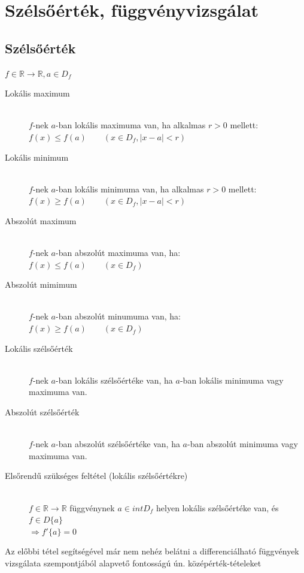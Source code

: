 \documentclass[margin=0px]{article}
\newcommand{\R}{\mathbb{R}}
\begin{document}
\section{Szélsőérték, függvényvizsgálat}
\subsection{Szélsőérték}
$ f \in \R \rightarrow \R, a \in D_f$
\begin{description}
    \item[Lokális maximum] \hfill \\
        $f$-nek $a$-ban lokális maximuma van, ha alkalmas $ r > 0$ mellett: \\
        $ f(x) \leq f(a) \qquad (x\in D_f, |x-a|<r)$
    \item[Lokális minimum] \hfill \\
        $f$-nek $a$-ban lokális minimuma van, ha alkalmas $ r > 0$ mellett: \\
        $ f(x) \geq f(a) \qquad (x\in D_f, |x-a|<r)$
    \item[Abszolút maximum] \hfill \\
        $f$-nek $a$-ban abszolút maximuma van, ha: \\
        $ f(x) \leq f(a) \qquad (x\in D_f)$
    \item[Abszolút mimimum] \hfill \\
        $f$-nek $a$-ban abszolút minumuma van, ha: \\
        $ f(x) \geq f(a) \qquad (x\in D_f)$
    \item[Lokális szélsőérték] \hfill \\
        $f$-nek $a$-ban lokális szélsőértéke van, ha $a$-ban lokális minimuma vagy maximuma van.
    \item[Abszolút szélsőérték] \hfill \\
        $f$-nek $a$-ban abszolút szélsőértéke van, ha $a$-ban abszolút minimuma vagy maximuma van.
    \item[Elsőrendű szükséges feltétel (lokális szélsőértékre)] \hfill \\
        $f \in \R \rightarrow \R$ függvénynek $ a \in intD_f $ helyen lokális szélsőértéke van, és $ f \in D\{a\}$ \\
        $ \Rightarrow f'\{a\} = 0 $
\end{description}
Az előbbi tétel segítségével már nem nehéz belátni a differenciálható függvények vizsgálata szempontjából alapvető fontosságú ún. középérték-tételeket
\end{document}
